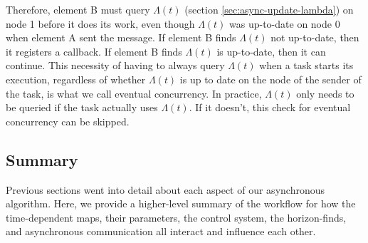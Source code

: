 \begin{bibunit}[unsrtnat]
Therefore, element B must query $\Lambda(t)$ (section
\ref{sec:async-update-lambda}) on node 1 before it does its work, even though
$\Lambda(t)$ was up-to-date on node 0 when element A sent the message. If
element B finds $\Lambda(t)$ not up-to-date, then it registers a callback. If
element B finds $\Lambda(t)$ is up-to-date, then it can continue. This necessity
of having to always query $\Lambda(t)$ when a task starts its execution,
regardless of whether $\Lambda(t)$ is up to date on the node of the sender of
the task, is what we call eventual concurrency. In practice, $\Lambda(t)$ only
needs to be queried if the task actually uses $\Lambda(t)$. If it doesn't, this
check for eventual concurrency can be skipped.

\subsection{Summary}

Previous sections went into detail about each aspect of our asynchronous
algorithm. Here, we provide a higher-level summary of the workflow for how the
time-dependent maps, their parameters, the control system, the horizon-finds, and
asynchronous communication all interact and influence each other.


\end{bibunit}
